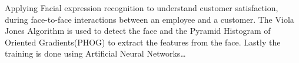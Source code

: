 
Applying Facial expression recognition to understand customer satisfaction, during face-to-face interactions between an employee and a customer. The Viola Jones Algorithm is used to detect the face and the Pyramid Histogram of Oriented Gradients(PHOG) to extract the features from the face. Lastly the training is done using Artificial Neural Networks\ldots
